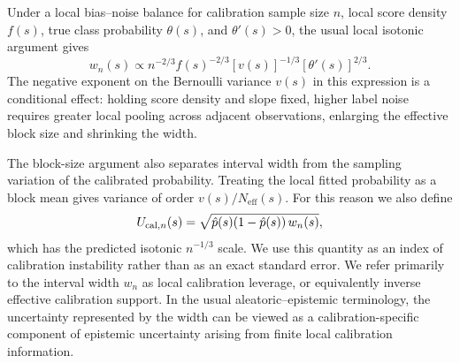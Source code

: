 \documentclass[11pt]{article}
\begin{document}
	Under a local bias--noise balance for calibration sample size $n$, local score density $f(s)$, true class probability $\theta(s)$, and $\theta'(s)>0$, the usual local isotonic argument gives
	\begin{equation}
		w_n(s) \propto n^{-2/3} f(s)^{-2/3}[v(s)]^{-1/3}[\theta'(s)]^{2/3}.
		\label{eq:intro_scaling}
	\end{equation}
	The negative exponent on the Bernoulli variance $v(s)$ in this expression is a conditional effect: holding score density and slope fixed, higher label noise requires greater local pooling across adjacent observations, enlarging the effective block size and shrinking the width.

	The block-size argument also separates interval width from the sampling variation of the calibrated probability. Treating the local fitted probability as a block mean gives variance of order $v(s)/N_{\mathrm{eff}}(s)$. For this reason we also define
	\begin{equation}
		U_{{\rm cal},n}(s) = \sqrt{\hat p(s)(1-\hat p(s))\,w_n(s)},
		\label{eq:intro_ucal}
	\end{equation}
	which has the predicted isotonic $n^{-1/3}$ scale. We use this quantity as an index of calibration instability rather than as an exact standard error. We refer primarily to the interval width $w_n$ as local calibration leverage, or equivalently inverse effective calibration support. In the usual aleatoric--epistemic terminology, the uncertainty represented by the width can be viewed as a calibration-specific component of epistemic uncertainty arising from finite local calibration information.
\end{document}
